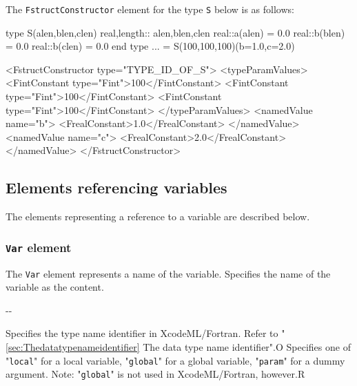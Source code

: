 The {\tt FstructConstructor} element for the type {\tt S} below is as follows:
\vspace{2mm}

\begin{Fexample2008}
type S(alen,blen,clen)
real,length:: alen,blen,clen
real::a(alen) = 0.0
real::b(blen) = 0.0
real::b(clen) = 0.0
end type
... = S(100,100,100)(b=1.0,c=2.0)
\end{Fexample2008}
\vspace{1mm}

\begin{XcodeMLFExample}
<FstructConstructor type="TYPE_ID_OF_S">
  <typeParamValues>
    <FintConstant type="Fint">100</FintConstant>
    <FintConstant type="Fint">100</FintConstant>
    <FintConstant type="Fint">100</FintConstant>
  </typeParamValues>
  <namedValue name="b">
     <FrealConstant>1.0</FrealConstant>
  </namedValue>
  <namedValue name="c">
     <FrealConstant>2.0</FrealConstant>
  </namedValue>
</FstructConstructor>
\end{XcodeMLFExample}


\subsection{Elements referencing variables}

The elements representing a reference to a variable are described below.

\subsubsection{ {\tt Var} element}

The {\tt Var} element represents a name of the variable.
Specifies the name of the variable as the content.


\begin{XcodeMLChildElements}
\XcodeMLElementDef{-}
{-}{-}
\end{XcodeMLChildElements}

\begin{XcodeMLAttributes}
{Specifies the type name identifier in XcodeML/Fortran.
 Refer to "\ref{sec:Thedatatypenameidentifier} The data type name identifier".}{O}
{Specifies one of
\newline
"{\tt local}" for a local variable,
\newline
"{\tt global}" for a global variable,
\newline
"{\tt param}" for a dummy argument.
\newline
Note: "{\tt global}" is not used in XcodeML/Fortran, however.}{R}
\end{XcodeMLAttributes}


